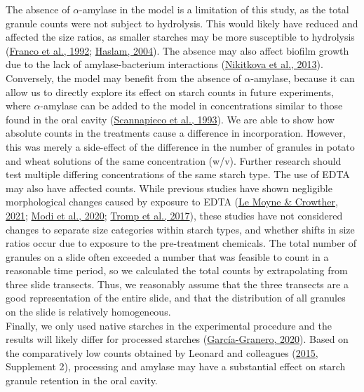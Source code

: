 \documentclass[
  b5paper,
]{book}
\begin{document}
The absence of \(\alpha\)-amylase in the model is a limitation of this
study, as the total granule counts were not subject to hydrolysis. This
would likely have reduced and affected the size ratios, as smaller
starches may be more susceptible to hydrolysis
(\protect\hyperlink{ref-francoStarchDegradation1992}{Franco et al.,
1992}; \protect\hyperlink{ref-haslamDecompositionStarch2004}{Haslam,
2004}). The absence may also affect biofilm growth due to the lack of
amylase-bacterium interactions
(\protect\hyperlink{ref-nikitkovaStarchBiofilms2013}{Nikitkova et al.,
2013}). Conversely, the model may benefit from the absence of
\(\alpha\)-amylase, because it can allow us to directly explore its
effect on starch counts in future experiments, where \(\alpha\)-amylase
can be added to the model in concentrations similar to those found in
the oral cavity
(\protect\hyperlink{ref-scannapiecoSalivaryAmylase1993}{Scannapieco et
al., 1993}). We are able to show how absolute counts in the treatments
cause a difference in incorporation. However, this was merely a
side-effect of the difference in the number of granules in potato and
wheat solutions of the same concentration (w/v). Further research should
test multiple differing concentrations of the same starch type. The use
of EDTA may also have affected counts. While previous studies have shown
negligible morphological changes caused by exposure to EDTA
(\protect\hyperlink{ref-lemoyneCalculusPretreatments2021}{Le Moyne \&
Crowther, 2021};
\protect\hyperlink{ref-modiCalculusMethodologies2020}{Modi et al.,
2020}; \protect\hyperlink{ref-trompEDTACalculus2017}{Tromp et al.,
2017}), these studies have not considered changes to separate size
categories within starch types, and whether shifts in size ratios occur
due to exposure to the pre-treatment chemicals. The total number of
granules on a slide often exceeded a number that was feasible to count
in a reasonable time period, so we calculated the total counts by
extrapolating from three slide transects. Thus, we reasonably assume
that the three transects are a good representation of the entire slide,
and that the distribution of all granules on the slide is relatively
homogeneous.\\
Finally, we only used native starches in the experimental procedure and
the results will likely differ for processed starches
(\protect\hyperlink{ref-graneroStarchTaphonomy2020}{García-Granero,
2020}). Based on the comparatively low counts obtained by Leonard and
colleagues (\protect\hyperlink{ref-leonardPlantMicroremains2015}{2015},
Supplement 2), processing and amylase may have a substantial effect on
starch granule retention in the oral cavity.
\end{document}
